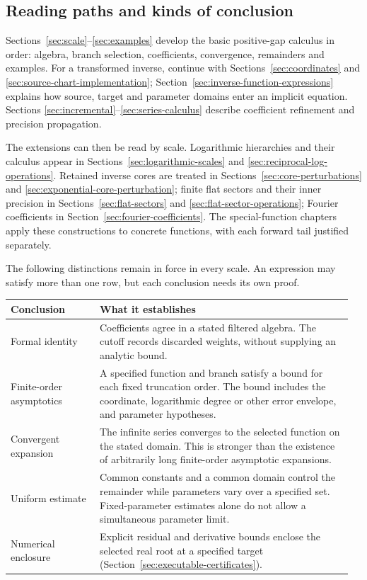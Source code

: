 \subsection{Reading paths and kinds of conclusion}

Sections~\ref{sec:scale}--\ref{sec:examples} develop the basic positive-gap
calculus in order: algebra, branch selection, coefficients, convergence,
remainders and examples. For a transformed inverse, continue with
Sections~\ref{sec:coordinates} and \ref{sec:source-chart-implementation};
Section~\ref{sec:inverse-function-expressions} explains how source, target
and parameter domains enter an implicit equation. Sections
\ref{sec:incremental}--\ref{sec:series-calculus} describe coefficient
refinement and precision propagation.

The extensions can then be read by scale. Logarithmic hierarchies and their
calculus appear in Sections~\ref{sec:logarithmic-scales} and
\ref{sec:reciprocal-log-operations}. Retained inverse cores are treated in
Sections~\ref{sec:core-perturbations} and
\ref{sec:exponential-core-perturbation}; finite flat sectors and their inner
precision in Sections~\ref{sec:flat-sectors} and
\ref{sec:flat-sector-operations}; Fourier coefficients in
Section~\ref{sec:fourier-coefficients}. The special-function chapters apply
these constructions to concrete functions, with each forward tail justified
separately.

The following distinctions remain in force in every scale. An expression
may satisfy more than one row, but each conclusion needs its own proof.

\begingroup
\small
\renewcommand{\arraystretch}{1.12}
\par\medskip\noindent
\begin{tabular}{@{}>{\raggedright\arraybackslash}p{0.25\linewidth}p{0.71\linewidth}@{}}
\toprule
Conclusion & What it establishes \\
\midrule
Formal identity & Coefficients agree in a stated filtered algebra. The
cutoff records discarded weights, without supplying an analytic bound. \\
Finite-order asymptotics & A specified function and branch satisfy a bound
for each fixed truncation order. The bound includes the coordinate,
logarithmic degree or other error envelope, and parameter hypotheses. \\
Convergent expansion & The infinite series converges to the selected
function on the stated domain. This is stronger than the existence of
arbitrarily long finite-order asymptotic expansions. \\
Uniform estimate & Common constants and a common domain control the
remainder while parameters vary over a specified set. Fixed-parameter
estimates alone do not allow a simultaneous parameter limit. \\
Numerical enclosure & Explicit residual and derivative bounds enclose the
selected real root at a specified target
(Section~\ref{sec:executable-certificates}). \\
\bottomrule
\end{tabular}
\par\medskip
\endgroup

